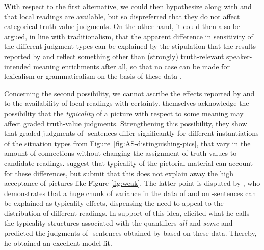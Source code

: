 \documentclass[fleqn,reqno,10pt,draft]{article}
\newcommand{\as}{\acro{as}}
\begin{document}
With respect to the first alternative, we could then hypothesize along with
\citeauthor{CliftonDube2010:Embedded-Implic} and \citeauthor{ChemlaSpector2010:Experimental-Ev} that local readings are
available, but so dispreferred that they do not affect categorical truth-value judgments. On the other hand, it could then also be argued, in line with traditionalism, that the apparent difference in sensitivity of the
different judgment types can be explained by the stipulation that the
results reported by \citeauthor{CliftonDube2010:Embedded-Implic} and
\citeauthor{ChemlaSpector2010:Experimental-Ev} reflect something other
than (strongly) truth-relevant speaker-intended meaning enrichments
after all, so that no case can be made for lexicalism or
grammaticalism on the basis of these data \citep[c.f.][for arguments
along these
lines]{Tielvan-Tiel2012:Embedded-Scalar,GeurtsTielvan-Tiel2013:Scalar-expressi}. 

Concerning the second possibility, we cannot ascribe the effects reported by
\citeauthor{CliftonDube2010:Embedded-Implic} and
\citeauthor{ChemlaSpector2010:Experimental-Ev} to the availability of
local readings with
certainty. \citet{ChemlaSpector2010:Experimental-Ev} themselves
acknowledge the possibility that the \emph{typicality} of a picture
with respect to some meaning may affect graded truth-value
judgments. Strengthening this possibility, they show that graded
judgments of \as-sentences differ significantly for different
instantiations of the situation types from
Figure~\ref{fig:AS-distinguishing-pics}, that vary in the amount of
connections without changing the assignment of truth values to
candidate readings. \citeauthor{ChemlaSpector2010:Experimental-Ev}
suggest that typicality of the pictorial material can account for
these differences, but submit that this does not explain away the high
acceptance of pictures like Figure \ref{fig:weak}. The latter point is
disputed by \citet{Tielvan-Tiel2012:Embedded-Scalar}, who demonstrates
that a huge chunk of variance in the data of
\citeauthor{CliftonDube2010:Embedded-Implic} and
\citeauthor{ChemlaSpector2010:Experimental-Ev} on \as-sentences can be
explained as typicality effects, dispensing the need to appeal to the
distribution of different readings. In support of this idea,
\citet{Tielvan-Tiel2012:Embedded-Scalar} elicited what he calls the
typicality structures associated with the quantifiers {\it all} and
{\it some} \citep[as done also by][]{DegenTanenhaus2011:Making-Inferenc} and predicted the judgments of \as-sentences obtained by
\citeauthor{ChemlaSpector2010:Experimental-Ev} based on these
data. Thereby, he obtained an excellent model fit. 
\end{document}
